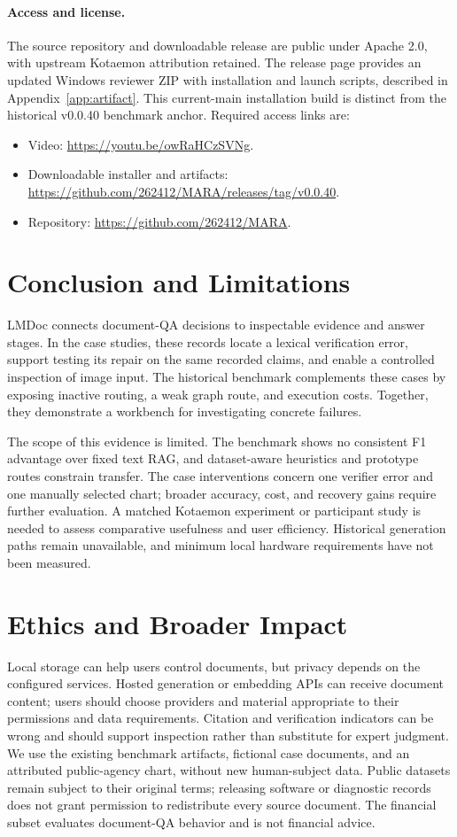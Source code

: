 \paragraph{Access and license.}
The source repository and downloadable release are public under Apache 2.0, with upstream Kotaemon attribution retained. The release page provides an updated Windows reviewer ZIP with installation and launch scripts, described in Appendix~\ref{app:artifact}. This current-main installation build is distinct from the historical v0.0.40 benchmark anchor. Required access links are:
\begin{itemize}
\item Video: \url{https://youtu.be/owRaHCzSVNg}.
\item Downloadable installer and artifacts: \url{https://github.com/262412/MARA/releases/tag/v0.0.40}.
\item Repository: \url{https://github.com/262412/MARA}.
\end{itemize}

\section{Conclusion and Limitations}
LMDoc connects document-QA decisions to inspectable evidence and answer stages. In the case studies, these records locate a lexical verification error, support testing its repair on the same recorded claims, and enable a controlled inspection of image input. The historical benchmark complements these cases by exposing inactive routing, a weak graph route, and execution costs. Together, they demonstrate a workbench for investigating concrete failures.

The scope of this evidence is limited. The benchmark shows no consistent F1 advantage over fixed text RAG, and dataset-aware heuristics and prototype routes constrain transfer. The case interventions concern one verifier error and one manually selected chart; broader accuracy, cost, and recovery gains require further evaluation. A matched Kotaemon experiment or participant study is needed to assess comparative usefulness and user efficiency. Historical generation paths remain unavailable, and minimum local hardware requirements have not been measured.

\section*{Ethics and Broader Impact}
Local storage can help users control documents, but privacy depends on the configured services. Hosted generation or embedding APIs can receive document content; users should choose providers and material appropriate to their permissions and data requirements. Citation and verification indicators can be wrong and should support inspection rather than substitute for expert judgment. We use the existing benchmark artifacts, fictional case documents, and an attributed public-agency chart, without new human-subject data. Public datasets remain subject to their original terms; releasing software or diagnostic records does not grant permission to redistribute every source document. The financial subset evaluates document-QA behavior and is not financial advice.
